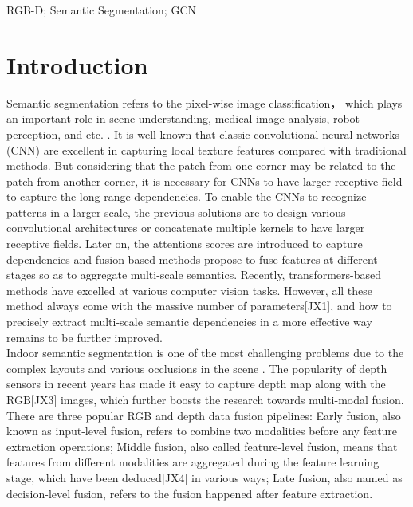 ﻿\documentclass[journal]{IEEEtran}
\begin{document}
\begin{IEEEkeywords}
    RGB-D; Semantic Segmentation; GCN
    \end{IEEEkeywords}


\section{Introduction} \label{sec_introduction}
 
    Semantic segmentation refers to the pixel-wise image classification， which plays an important role in scene understanding, medical image analysis, robot perception, and etc. \cite{mo2022review}. It is well-known that classic convolutional neural networks (CNN) \cite{krizhevsky2017alexnet} are excellent in capturing local texture features compared with traditional methods. But considering that the patch from one corner may be related to the patch from another corner, it is necessary for CNNs to have larger receptive field to capture the long-range dependencies. To enable the CNNs to recognize patterns in a larger scale, the previous solutions are to design various convolutional architectures \cite{wei2018dilated} or concatenate multiple kernels \cite{simonyan2014vgg} to have larger receptive fields. Later on, the attentions scores \cite{hu2018seNet}\cite{wang2018nonLocal} are introduced to capture dependencies and fusion-based methods \cite{yuan2020OCrep}\cite{li2020gatedfuse} propose to fuse features at different stages so as to aggregate multi-scale semantics. Recently, transformers-based methods \cite{carion2020DETR}\cite{dosovitskiy2020ViT} have excelled at various computer vision tasks. However, all these method always come with the massive number of parameters[JX1], and how to precisely extract multi-scale semantic dependencies in a more effective way remains to be further improved. \\   
    [JX2]
    Indoor semantic segmentation is one of the most challenging problems due to the complex layouts and various occlusions in the scene \cite{wang2021brief}. The popularity of depth sensors in recent years has made it easy to capture depth map along with the RGB[JX3] images, which further boosts the research towards multi-modal fusion. There are three popular RGB and depth data fusion pipelines: Early fusion, also known as input-level fusion, refers to combine two modalities before any feature extraction operations; Middle fusion, also called feature-level fusion, means that features from different modalities are aggregated during the feature learning stage, which have been deduced[JX4] in various ways; Late fusion, also named as decision-level fusion, refers to the fusion happened after feature extraction. \\   
\end{document}

